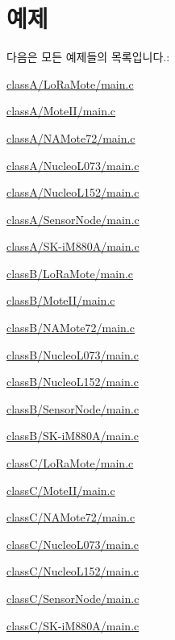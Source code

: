 \section{예제}
다음은 모든 예제들의 목록입니다.\+:\begin{DoxyCompactItemize}
\item 
\mbox{\hyperlink{class_a_2_lo_ra_mote_2main_8c-example}{class\+A/\+Lo\+Ra\+Mote/main.\+c}}
\item 
\mbox{\hyperlink{class_a_2_mote_i_i_2main_8c-example}{class\+A/\+Mote\+I\+I/main.\+c}}
\item 
\mbox{\hyperlink{class_a_2_n_a_mote72_2main_8c-example}{class\+A/\+N\+A\+Mote72/main.\+c}}
\item 
\mbox{\hyperlink{class_a_2_nucleo_l073_2main_8c-example}{class\+A/\+Nucleo\+L073/main.\+c}}
\item 
\mbox{\hyperlink{class_a_2_nucleo_l152_2main_8c-example}{class\+A/\+Nucleo\+L152/main.\+c}}
\item 
\mbox{\hyperlink{class_a_2_sensor_node_2main_8c-example}{class\+A/\+Sensor\+Node/main.\+c}}
\item 
\mbox{\hyperlink{class_a_2_s_k-i_m880_a_2main_8c-example}{class\+A/\+S\+K-\/i\+M880\+A/main.\+c}}
\item 
\mbox{\hyperlink{class_b_2_lo_ra_mote_2main_8c-example}{class\+B/\+Lo\+Ra\+Mote/main.\+c}}
\item 
\mbox{\hyperlink{class_b_2_mote_i_i_2main_8c-example}{class\+B/\+Mote\+I\+I/main.\+c}}
\item 
\mbox{\hyperlink{class_b_2_n_a_mote72_2main_8c-example}{class\+B/\+N\+A\+Mote72/main.\+c}}
\item 
\mbox{\hyperlink{class_b_2_nucleo_l073_2main_8c-example}{class\+B/\+Nucleo\+L073/main.\+c}}
\item 
\mbox{\hyperlink{class_b_2_nucleo_l152_2main_8c-example}{class\+B/\+Nucleo\+L152/main.\+c}}
\item 
\mbox{\hyperlink{class_b_2_sensor_node_2main_8c-example}{class\+B/\+Sensor\+Node/main.\+c}}
\item 
\mbox{\hyperlink{class_b_2_s_k-i_m880_a_2main_8c-example}{class\+B/\+S\+K-\/i\+M880\+A/main.\+c}}
\item 
\mbox{\hyperlink{class_c_2_lo_ra_mote_2main_8c-example}{class\+C/\+Lo\+Ra\+Mote/main.\+c}}
\item 
\mbox{\hyperlink{class_c_2_mote_i_i_2main_8c-example}{class\+C/\+Mote\+I\+I/main.\+c}}
\item 
\mbox{\hyperlink{class_c_2_n_a_mote72_2main_8c-example}{class\+C/\+N\+A\+Mote72/main.\+c}}
\item 
\mbox{\hyperlink{class_c_2_nucleo_l073_2main_8c-example}{class\+C/\+Nucleo\+L073/main.\+c}}
\item 
\mbox{\hyperlink{class_c_2_nucleo_l152_2main_8c-example}{class\+C/\+Nucleo\+L152/main.\+c}}
\item 
\mbox{\hyperlink{class_c_2_sensor_node_2main_8c-example}{class\+C/\+Sensor\+Node/main.\+c}}
\item 
\mbox{\hyperlink{class_c_2_s_k-i_m880_a_2main_8c-example}{class\+C/\+S\+K-\/i\+M880\+A/main.\+c}}
\end{DoxyCompactItemize}
